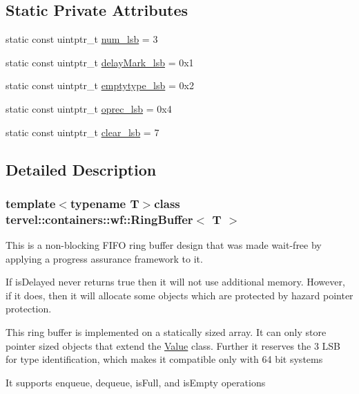 \subsection*{Static Private Attributes}
\begin{DoxyCompactItemize}
\item 
static const uintptr\+\_\+t \hyperlink{classtervel_1_1containers_1_1wf_1_1_ring_buffer_a88443e08c1d248ce79ed7a2dc54c00c4}{num\+\_\+lsb} = 3
\item 
static const uintptr\+\_\+t \hyperlink{classtervel_1_1containers_1_1wf_1_1_ring_buffer_a1bd646f1d7df0a14d64078d2dcef1cb5}{delay\+Mark\+\_\+lsb} = 0x1
\item 
static const uintptr\+\_\+t \hyperlink{classtervel_1_1containers_1_1wf_1_1_ring_buffer_aaeeec7e2573a54c06823fb6800437b4f}{emptytype\+\_\+lsb} = 0x2
\item 
static const uintptr\+\_\+t \hyperlink{classtervel_1_1containers_1_1wf_1_1_ring_buffer_a83e184f9dffd2a06038726f74640c554}{oprec\+\_\+lsb} = 0x4
\item 
static const uintptr\+\_\+t \hyperlink{classtervel_1_1containers_1_1wf_1_1_ring_buffer_afabc2215759bfbb00144024609700b7d}{clear\+\_\+lsb} = 7
\end{DoxyCompactItemize}


\subsection{Detailed Description}
\subsubsection*{template$<$typename T$>$class tervel\+::containers\+::wf\+::\+Ring\+Buffer$<$ T $>$}

This is a non-\/blocking F\+I\+F\+O ring buffer design that was made wait-\/free by applying a progress assurance framework to it. 

If is\+Delayed never returns true then it will not use additional memory. However, if it does, then it will allocate some objects which are protected by hazard pointer protection.

This ring buffer is implemented on a statically sized array. It can only store pointer sized objects that extend the \hyperlink{classtervel_1_1containers_1_1wf_1_1_ring_buffer_1_1_value}{Value} class. Further it reserves the 3 L\+S\+B for type identification, which makes it compatible only with 64 bit systems

It supports enqueue, dequeue, is\+Full, and is\+Empty operations


